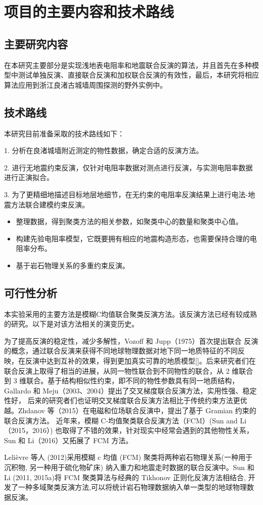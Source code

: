 \section{项目的主要内容和技术路线}

\subsection{主要研究内容}

在本研究主要部分是实现浅地表电阻率和地震联合反演的算法，并且首先在多种模型中测试单独反演、直接联合反演和加权联合反演的有效性，最后，本研究将相应算法应用到浙江良渚古城墙周围探测的野外实例中。

\subsection{技术路线}

本研究目前准备采取的技术路线如下：

1. 分析在良渚城墙附近测定的物性数据，确定合适的反演方法。

2. 进行无地震约束反演，仅针对电阻率数据对测点进行反演，与实测电阻率数据进行正演拟合。

3. 为了更精细地描述目标地层地细节，在无约束的电阻率反演结果上进行电法-地震方法联合建模约束反演。
\begin{itemize}
    \item 整理数据，得到聚类方法的相关参数，如聚类中心的数量和聚类中心值。
    \item 构建先验电阻率模型，它既要拥有相应的地震构造形态，也需要保持合理的电阻率分布。
    \item 基于岩石物理关系的多重约束反演。
\end{itemize}

\subsection{可行性分析}

本实验采用的主要方法是模糊C均值联合聚类反演方法。该反演方法已经有较成熟的研究。以下是对该方法相关的演变历史。

为了提高反演的稳定性，减少多解性，Vozoff 和 Jupp（1975）首次提出联合 反演的概念，通过联合反演来获得不同地球物理数据对地下同一地质特征的不同反 映，在反演中达到互补的效果，得到更加真实可靠的地质模型[]。后来研究者们在 联合反演上取得了相当的进展，从同一物性联合到不同物性的联合，从 2 维联合到 3 维联合。基于结构相似性约束，即不同的物性参数具有同一地质结构，Gallardo 和 Meju（2003、2004）提出了交叉梯度联合反演方法，实用性强、稳定性好， 后来的研究者们也证明交叉梯度联合反演方法相比于传统约束方法更优越。Zhdanov 等（2015）在电磁和位场联合反演中，提出了基于 Gramian 约束的联合反演方法。 近年来，模糊 C-均值聚类联合反演方法（FCM）(Sun and Li （2015，2016）) 也取得了不错的效果，针对现实中经常会遇到的其他物性关系，Sun 和 Li（2016）又拓展了 FCM 方法。

Lelièvre 等人 (2012)采用模糊 c 均值 (FCM) 聚类将两种岩石物理关系(一种用于沉积物, 另一种用于硫化物矿床) 纳入重力和地震走时数据的联合反演中。Sun 和 Li (2011, 2015a)将 FCM 聚类算法与经典的 Tikhonov 正则化反演方法相结合, 开发了一种多域聚类反演方法,可以将统计岩石物理数据纳入单一类型的地球物理数据反演。
